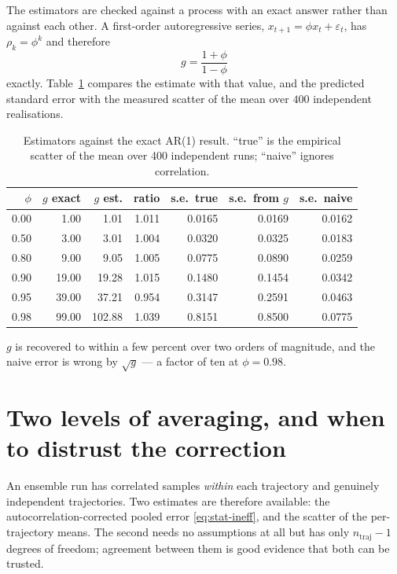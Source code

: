 \documentclass[11pt,a4paper]{report}
\begin{document}
The estimators are checked against a process with an exact answer rather than
against each other. A first-order autoregressive series, $x_{t+1} = \phi x_t +
\varepsilon_t$, has $\rho_k = \phi^{k}$ and therefore
\begin{equation}
  g = \frac{1+\phi}{1-\phi}
\end{equation}
exactly. Table~\ref{tab:ar1} compares the estimate with that value, and the
predicted standard error with the measured scatter of the mean over $400$
independent realisations.

\begin{table}[ht]
\centering
\caption{Estimators against the exact AR(1) result. ``true'' is the empirical
scatter of the mean over 400 independent runs; ``naive'' ignores correlation.}
\label{tab:ar1}
\begin{tabular}{@{}rrrrrrr@{}}
\toprule
$\phi$ & $g$ exact & $g$ est. & ratio & s.e.\ true & s.e.\ from $g$ & s.e.\ naive \\
\midrule
0.00 & 1.00  & 1.01   & 1.011 & 0.0165 & 0.0169 & 0.0162 \\
0.50 & 3.00  & 3.01   & 1.004 & 0.0320 & 0.0325 & 0.0183 \\
0.80 & 9.00  & 9.05   & 1.005 & 0.0775 & 0.0890 & 0.0259 \\
0.90 & 19.00 & 19.28  & 1.015 & 0.1480 & 0.1454 & 0.0342 \\
0.95 & 39.00 & 37.21  & 0.954 & 0.3147 & 0.2591 & 0.0463 \\
0.98 & 99.00 & 102.88 & 1.039 & 0.8151 & 0.8500 & 0.0775 \\
\bottomrule
\end{tabular}
\end{table}

$g$ is recovered to within a few percent over two orders of magnitude, and the
naive error is wrong by $\sqrt{g}$ --- a factor of ten at $\phi = 0.98$.

\section{Two levels of averaging, and when to distrust the correction}

An ensemble run has correlated samples \emph{within} each trajectory and genuinely
independent trajectories. Two estimates are therefore available: the
autocorrelation-corrected pooled error \eqref{eq:stat-ineff}, and the scatter of
the per-trajectory means. The second needs no assumptions at all but has only
$n_{\mathrm{traj}}-1$ degrees of freedom; agreement between them is good evidence
that both can be trusted.
\end{document}
